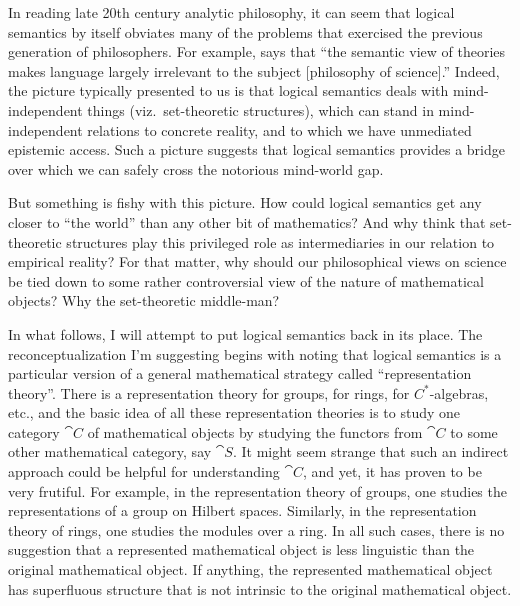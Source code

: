 In reading late 20th century analytic philosophy, it can seem that
logical semantics by itself obviates many of the problems that
exercised the previous generation of philosophers.  For example,
\citet[p.\ 222]{bas1989} says that ``the semantic view of theories
makes language largely irrelevant to the subject [philosophy of
science].''  Indeed, the picture typically presented to us is that
logical semantics deals with mind-independent things (viz.\
set-theoretic structures), which can stand in mind-independent
relations to concrete reality, and to which we have unmediated
epistemic access.  Such a picture suggests that logical semantics
provides a bridge over which we can safely cross the notorious
mind-world gap.

But something is fishy with this picture.  How could logical semantics
get any closer to ``the world'' than any other bit of mathematics?
And why think that set-theoretic structures play this privileged role
as intermediaries in our relation to empirical reality?  For that
matter, why should our philosophical views on science be tied down to
some rather controversial view of the nature of mathematical objects?
Why the set-theoretic middle-man?

In what follows, I will attempt to put logical semantics back in its
place.  The reconceptualization I'm suggesting begins with noting that
logical semantics is a particular version of a general mathematical
strategy called ``representation theory''.  There is a representation
theory for groups, for rings, for $C^*$-algebras, etc., and the basic
idea of all these representation theories is to study one category
$\cat{C}$ of mathematical objects by studying the functors from
$\cat{C}$ to some other mathematical category, say $\cat{S}$.  It
might seem strange that such an indirect approach could be helpful for
understanding $\cat{C}$, and yet, it has proven to be very frutiful.
For example, in the representation theory of groups, one studies the
representations of a group on Hilbert spaces.  Similarly, in the
representation theory of rings, one studies the modules over a ring.
In all such cases, there is no suggestion that a represented
mathematical object is less linguistic than the original mathematical
object.  If anything, the represented mathematical object has
superfluous structure that is not intrinsic to the original
mathematical object.

